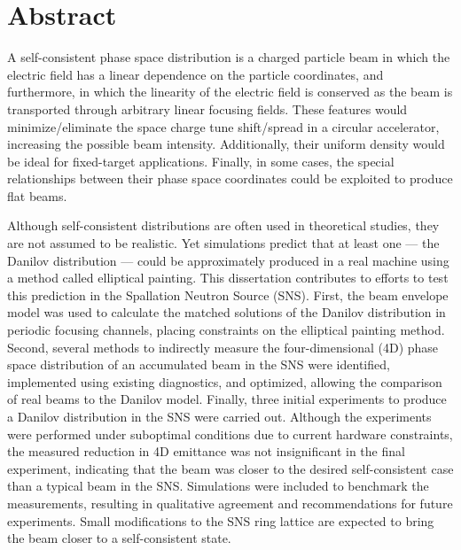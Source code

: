\chapter*{Abstract} 

A self-consistent phase space distribution is a charged particle beam in which the electric field has a linear dependence on the particle coordinates, and furthermore, in which the linearity of the electric field is conserved as the beam is transported through arbitrary linear focusing fields. These features would minimize/eliminate the space charge tune shift/spread in a circular accelerator, increasing the possible beam intensity. Additionally, their uniform density would be ideal for fixed-target applications. Finally, in some cases, the special relationships between their phase space coordinates could be exploited to produce flat beams. 

Although self-consistent distributions are often used in theoretical studies, they are not assumed to be realistic. Yet simulations predict that at least one — the Danilov distribution — could be approximately produced in a real machine using a method called elliptical painting. This dissertation contributes to efforts to test this prediction in the Spallation Neutron Source (SNS). First, the beam envelope model was used to calculate the matched solutions of the Danilov distribution in periodic focusing channels, placing constraints on the elliptical painting method. Second, several methods to indirectly measure the four-dimensional (4D) phase space distribution of an accumulated beam in the SNS were identified, implemented using existing diagnostics, and optimized, allowing the comparison of real beams to the Danilov model. Finally, three initial experiments to produce a Danilov distribution in the SNS were carried out. Although the experiments were performed under suboptimal conditions due to current hardware constraints, the measured reduction in 4D emittance was not insignificant in the final experiment, indicating that the beam was closer to the desired self-consistent case than a typical beam in the SNS. Simulations were included to benchmark the measurements, resulting in qualitative agreement and recommendations for future experiments. Small modifications to the SNS ring lattice are expected to bring the beam closer to a self-consistent state.
